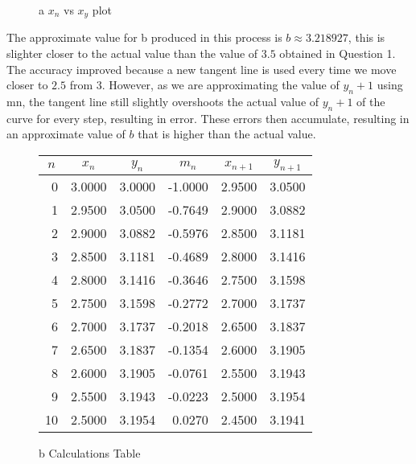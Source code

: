 \documentclass[answers,addpoints]{exam}
\begin{document}
\begin{questions}
\begin{solution}
\begin{figure}[H]
      \caption{a $x_n$ vs $x_y$ plot}
      \label{fig:2a-vii-plot}
    \end{figure}

    The approximate value for b produced in this process is $b \approx 3.218927$, this is slighter closer to the actual value than the value of $3.5$ obtained in Question 1. The accuracy improved because a new tangent line is used every time we move closer to $2.5$ from $3$. However, as we are approximating the value of $y_n+1$ using mn, the tangent line still slightly overshoots the actual value of $y_n+1$ of the curve for every step, resulting in error. These errors then accumulate, resulting in an approximate value of $b$ that is higher than the actual value.

    \begin{figure}[H]
      \centering
      \begin{tabular}{r r r r r r}
        \hline
        \multicolumn{1}{c}{$n$} &
        \multicolumn{1}{c}{$x_n$} &
        \multicolumn{1}{c}{$y_n$} &
        \multicolumn{1}{c}{$m_n$} &
        \multicolumn{1}{c}{$x_{n+1}$} &
        \multicolumn{1}{c}{$y_{n+1}$} \\
        \hline
        0 & 3.0000 & 3.0000 & -1.0000 & 2.9500 & 3.0500 \\
        1 & 2.9500 & 3.0500 & -0.7649 & 2.9000 & 3.0882 \\
        2 & 2.9000 & 3.0882 & -0.5976 & 2.8500 & 3.1181 \\
        3 & 2.8500 & 3.1181 & -0.4689 & 2.8000 & 3.1416 \\
        4 & 2.8000 & 3.1416 & -0.3646 & 2.7500 & 3.1598 \\
        5 & 2.7500 & 3.1598 & -0.2772 & 2.7000 & 3.1737 \\
        6 & 2.7000 & 3.1737 & -0.2018 & 2.6500 & 3.1837 \\
        7 & 2.6500 & 3.1837 & -0.1354 & 2.6000 & 3.1905 \\
        8 & 2.6000 & 3.1905 & -0.0761 & 2.5500 & 3.1943 \\
        9 & 2.5500 & 3.1943 & -0.0223 & 2.5000 & 3.1954 \\
        10 & 2.5000 & 3.1954 & 0.0270 & 2.4500 & 3.1941 \\
        \hline
      \end{tabular}
      \caption{b Calculations Table}
      \label{fig:2b-table}
    \end{figure}


\end{solution}
\end{questions}
\end{document}
